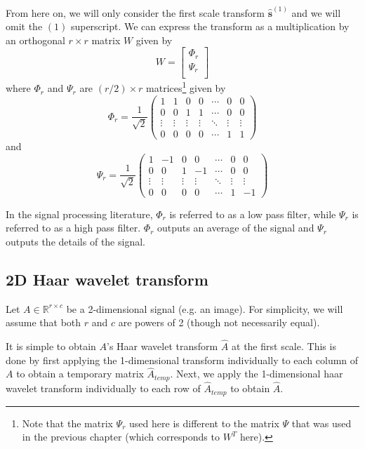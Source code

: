 \documentclass[final,3p]{report}
\let\bs\boldsymbol
\begin{document}
From here on, we will only consider the first scale transform $\hat{\bs s}^{(1)}$ and we will omit the $(1)$ superscript.
We can express the transform as a multiplication by an orthogonal $r\times r$ matrix $W$ given by
\begin{equation}
W = \begin{bmatrix}
  \Phi_r \\
  \Psi_r \\
\end{bmatrix}
\end{equation}
where $\Phi_r$ and $\Psi_r$ are $(r/2)\times r$ matrices\footnote{Note that the matrix $\Psi_r$ used here is different to the matrix $\Psi$ that was used in the previous chapter (which corresponds to $W^T$ here).} given by
\begin{equation*}
\Phi_r = \frac{1}{\sqrt{2}} \begin{pmatrix}
1&1&0&0&\cdots&0&0\\
0&0&1&1&\cdots&0&0\\
\vdots&\vdots&\vdots&\vdots&\ddots&\vdots&\vdots\\
0&0&0&0&\cdots&1&1
\end{pmatrix}
\end{equation*}
and 
\begin{equation*}
  \Psi_r = \frac{1}{\sqrt{2}} \begin{pmatrix}
    1&-1&0&0&\cdots&0&0\\
    0&0&1&-1&\cdots&0&0\\
    \vdots&\vdots&\vdots&\vdots&\ddots&\vdots&\vdots\\
    0&0&0&0&\cdots&1&-1
  \end{pmatrix}
\end{equation*}


In the signal processing literature, $\Phi_r$ is referred to as a low pass filter, while $\Psi_r$ is referred to as a high pass filter.
$\Phi_r$ outputs an average of the signal and $\Psi_r$ outputs the details of the signal.

\subsection{2D Haar wavelet transform}
Let $A \in \mathbb{R}^{r\times c}$ be a 2-dimensional signal (e.g. an image).
For simplicity, we will assume that both $r$ and $c$ are powers of 2 (though not necessarily equal).

It is simple to obtain $A$'s Haar wavelet transform $\hat{A}$ at the first scale.
This is done by first applying the 1-dimensional transform individually to each column of $A$ to obtain a temporary matrix $\hat A_{temp}$.
Next, we apply the 1-dimensional haar wavelet transform individually to each row of $\hat A_{temp}$ to obtain $\hat A$.
\end{document}

